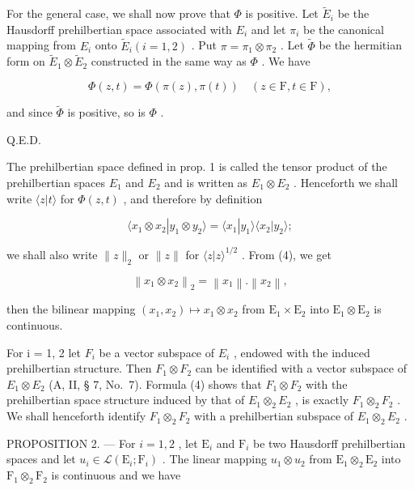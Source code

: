 For the general case, we shall now prove that \(\Phi\) is positive. Let \(\tilde{E}_{i}\) be the Hausdorff prehilbertian space associated with \(E_{i}\) and let \(\pi_{i}\) be the canonical mapping from \(E_{i}\) onto \(\tilde{E}_{i} (i = 1, 2)\) . Put \(\pi = \pi_{1} \otimes \pi_{2}\) . Let \(\tilde{\Phi}\) be the hermitian form on \(\tilde{E}_{1} \otimes \tilde{E}_{2}\) constructed in the same way as \(\Phi\) . We have

\[
\Phi (z, t) = \Phi (\pi (z), \pi (t)) \quad (z \in \mathrm{F}, t \in \mathrm{F}),
\]

and since \(\tilde{\Phi}\) is positive, so is \(\Phi\) .

Q.E.D.

The prehilbertian space defined in prop. 1 is called the tensor product of the prehilbertian spaces \(E_{1}\) and \(E_{2}\) and is written as \(E_{1} \otimes E_{2}\) . Henceforth we shall write \(\langle z|t\rangle\) for \(\Phi(z,t)\) , and therefore by definition

\[
\langle x _ {1} \otimes x _ {2} | y _ {1} \otimes y _ {2} \rangle = \langle x _ {1} | y _ {1} \rangle \langle x _ {2} | y _ {2} \rangle ;\tag{4}
\]

we shall also write \(\| z\| _2\) or \(\| z\|\) for \(\langle z|z\rangle^{1 / 2}\) . From (4), we get

\[
\left\| x _ {1} \otimes x _ {2} \right\| _ {2} = \left\| x _ {1} \right\|. \left\| x _ {2} \right\|,\tag{5}
\]

then the bilinear mapping \((x_{1}, x_{2}) \mapsto x_{1} \otimes x_{2}\) from \(\mathrm{E}_1 \times \mathrm{E}_2\) into \(\mathrm{E}_1 \otimes \mathrm{E}_2\) is continuous.

For i = 1, 2 let \(F_{i}\) be a vector subspace of \(E_{i}\) , endowed with the induced prehilbertian structure. Then \(F_{1} \otimes F_{2}\) can be identified with a vector subspace of \(E_{1} \otimes E_{2}\) (A, II, § 7, No.~7). Formula (4) shows that \(F_{1} \otimes F_{2}\) with the prehilbertian space structure induced by that of \(E_{1} \otimes_{2} E_{2}\) , is exactly \(F_{1} \otimes_{2} F_{2}\) . We shall henceforth identify \(F_{1} \otimes_{2} F_{2}\) with a prehilbertian subspace of \(E_{1} \otimes_{2} E_{2}\) .

PROPOSITION 2. --- For \(i = 1, 2\) , let \(\mathrm{E}_{i}\) and \(\mathrm{F}_{i}\) be two Hausdorff prehilbertian spaces and let \(u_{i} \in \mathcal{L}(\mathrm{E}_{i}; \mathrm{F}_{i})\) . The linear mapping \(u_{1} \otimes u_{2}\) from \(\mathrm{E}_{1} \otimes_{2} \mathrm{E}_{2}\) into \(\mathrm{F}_{1} \otimes_{2} \mathrm{F}_{2}\) is continuous and we have

